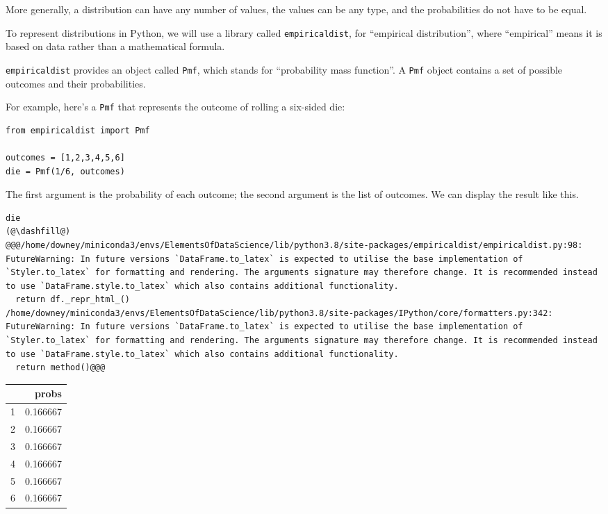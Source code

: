More generally, a distribution can have any number of values, the values
can be any type, and the probabilities do not have to be equal.

To represent distributions in Python, we will use a library called
\passthrough{\lstinline!empiricaldist!}, for ``empirical distribution'',
where ``empirical'' means it is based on data rather than a mathematical
formula.

\passthrough{\lstinline!empiricaldist!} provides an object called
\passthrough{\lstinline!Pmf!}, which stands for ``probability mass
function''. A \passthrough{\lstinline!Pmf!} object contains a set of
possible outcomes and their probabilities.

For example, here's a \passthrough{\lstinline!Pmf!} that represents the
outcome of rolling a six-sided die:

\begin{lstlisting}[]
from empiricaldist import Pmf

outcomes = [1,2,3,4,5,6]
die = Pmf(1/6, outcomes)
\end{lstlisting}

The first argument is the probability of each outcome; the second
argument is the list of outcomes. We can display the result like this.

\begin{lstlisting}[]
die
(@\dashfill@)
@@@/home/downey/miniconda3/envs/ElementsOfDataScience/lib/python3.8/site-packages/empiricaldist/empiricaldist.py:98: FutureWarning: In future versions `DataFrame.to_latex` is expected to utilise the base implementation of `Styler.to_latex` for formatting and rendering. The arguments signature may therefore change. It is recommended instead to use `DataFrame.style.to_latex` which also contains additional functionality.
  return df._repr_html_()
/home/downey/miniconda3/envs/ElementsOfDataScience/lib/python3.8/site-packages/IPython/core/formatters.py:342: FutureWarning: In future versions `DataFrame.to_latex` is expected to utilise the base implementation of `Styler.to_latex` for formatting and rendering. The arguments signature may therefore change. It is recommended instead to use `DataFrame.style.to_latex` which also contains additional functionality.
  return method()@@@
\end{lstlisting}

\begin{tabular}{lr}
\midrule
{} &     probs \\
\midrule
1 &  0.166667 \\
2 &  0.166667 \\
3 &  0.166667 \\
4 &  0.166667 \\
5 &  0.166667 \\
6 &  0.166667 \\
\midrule
\end{tabular}

